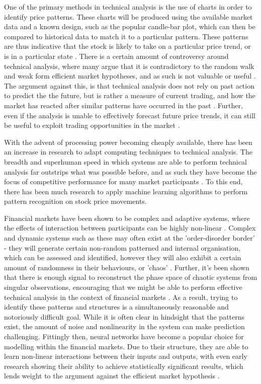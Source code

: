 \documentclass[a4paper,11pt,oneside]{article}
\theoremstyle{plain}
\theoremstyle{definition}
\begin{document}
One of the primary methods in technical analysis is the use of charts in order to identify price patterns. 
These charts will be produced using the available market data and a known design, such as the popular candle-bar 
plot, which can then be compared to historical data to match it to a particular pattern. These patterns are thus 
indicative that the stock is likely to take on a particular price trend, or is in a particular state \cite {Murphy}.  
There is a certain amount of controversy around technical analysis, where many argue that it is contradictory 
to the random walk and weak form efficient market hypotheses, and as such is not valuable or useful \cite {Griffioen}. 
The argument against this, is that technical analysis does not rely on past action to predict the the future, but is 
rather a measure of current trading, and how the market has reacted after similar patterns have occurred in the 
past \cite {Kahn}. Further, even if the analysis is unable to effectively forecast future price trends, it can still be useful 
to exploit trading opportunities in the market \cite{Schwager}.
\hfill \break 

With the advent of processing power becoming cheaply available, there has been an increase in research to 
adapt computing techniques to technical analysis. The breadth and superhuman speed in which systems are 
able to perform technical analysis far outstrips what was possible before, and as such they have become the 
focus of competitive performance for many market participants \cite {Johnson}. To this end, there has been much 
research to apply machine learning algorithms to perform pattern recognition on stock price movements.
\hfill \break

Financial markets have been shown to be complex and adaptive systems, where the effects of interaction 
between participants can be highly non-linear \cite {Arthur}. Complex and dynamic systems such as these may 
often exist at the 'order-disorder border' - they will generate certain non-random patterned and internal organisation, 
which can be assessed and identified, however they will also exhibit a certain amount of randomness in their behaviours, 
or 'chaos' \cite {Crutchfield}. Further, it's been shown that there is enough signal to reconstruct 
the phase space of chaotic systems from singular observations, encouraging that we might be able to perform 
effective technical analysis in the context of financial markets \cite{Packard, Takens}. As a result, trying to identify these patterns and structures is a simultaneously 
reasonable and notoriously difficult goal. While it is often clear in hindsight that the patterns exist, the amount of 
noise and nonlinearity in the system can make prediction challenging.
Fittingly then, neural networks have become a popular choice for modelling within the financial markets. Due to 
their structure, they are able to learn non-linear interactions between their inputs and outputs, with even early research 
showing their ability to achieve statistically significant results, which lends weight to the 
argument against the efficient market hypothesis \cite {Skabar}. 
\hfill \break
\end{document}

